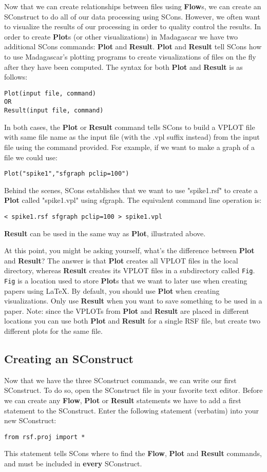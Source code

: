 Now that we can create relationships between files using \textbf{Flow}s, we can create an SConstruct to do all of our data processing using SCons.   However, we often want to visualize the results of our processing in order to quality control the results. In order to create \textbf{Plot}s (or other visualizations) in Madagascar we have two additional SCons commands:  \textbf{Plot} and \textbf{Result}.  \textbf{Plot} and \textbf{Result} tell SCons how to use Madagascar's plotting programs to create visualizations of files on the fly after they have been computed.  The syntax for both \textbf{Plot} and \textbf{Result} is as follows:
\begin{verbatim}
Plot(input file, command)
OR
Result(input file, command)
\end{verbatim}
In both cases, the \textbf{Plot} or \textbf{Result} command tells SCons to build a VPLOT file with same file name as the input file (with the .vpl suffix instead) from the input file using the command provided.  For example, if we want to make a graph of a file we could use:
\begin{verbatim}
Plot("spike1","sfgraph pclip=100")
\end{verbatim}
Behind the scenes, SCons establishes that we want to use "spike1.rsf" to create a \textbf{Plot} called "spike1.vpl" using sfgraph.  The equivalent command line operation is:
\begin{verbatim}
< spike1.rsf sfgraph pclip=100 > spike1.vpl
\end{verbatim}
\textbf{Result} can be used in the same way as \textbf{Plot}, illustrated above.  

At this point, you might be asking yourself, what's the difference between \textbf{Plot} and \textbf{Result}?  The answer is that \textbf{Plot} creates all VPLOT files in the local directory, whereas \textbf{Result} creates its VPLOT files in a subdirectory called \texttt{Fig}. \texttt{Fig} is a location used to store \textbf{Plot}s that we want to later use when creating papers using \LaTeX.  By default, you should use \textbf{Plot} when creating visualizations.  Only use \textbf{Result} when you want to save something to be used in a paper.  Note: since the VPLOTs from \textbf{Plot} and \textbf{Result} are placed in different locations you can use both \textbf{Plot} and \textbf{Result} for a single RSF file, but create two different plots for the same file.

\subsection{Creating an SConstruct}
Now that we have the three SConstruct commands, we can write our first SConstruct.  To do so, open the SConstruct file in your favorite text editor.  Before we can create any \textbf{Flow}, \textbf{Plot} or \textbf{Result} statements we have to add a first statement to the SConstruct.  Enter the following statement (verbatim) into your new SConstruct:
\begin{verbatim}
from rsf.proj import *
\end{verbatim}
This statement tells SCons where to find the \textbf{Flow}, \textbf{Plot} and \textbf{Result} commands, and must be included in \textbf{every} SConstruct.

